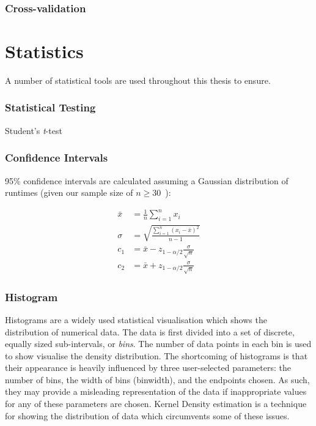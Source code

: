 \subsubsection{Cross-validation}


\section{Statistics}

A number of statistical tools are used throughout this thesis to
ensure.

\subsubsection{Statistical Testing}

Student's \emph{t}-test


\subsubsection{Confidence Intervals}

95\% confidence intervals are calculated assuming a Gaussian
distribution of runtimes (given our sample size of
$n \ge 30$~\cite{Georges2007}):

\begin{align}
\bar{x} &= \frac{1}{n}\sum_{i=1}^{n} x_i\\
\sigma &= \sqrt{\frac{\sum_{i=1}^{n}(x_i - \bar{x})^2}{n - 1}}\\
c_1 &= \bar{x} - z_{1-\alpha/2}\frac{\sigma}{\sqrt{n}}\\
c_2 &= \bar{x} + z_{1-\alpha/2}\frac{\sigma}{\sqrt{n}}
\end{align}


\subsubsection{Histogram}

Histograms are a widely used statistical visualisation which shows the
distribution of numerical data. The data is first divided into a set
of discrete, equally sized sub-intervals, or \emph{bins}. The number
of data points in each bin is used to show visualise the density
distribution. The shortcoming of histograms is that their appearance
is heavily influenced by three user-selected parameters: the number of
bins, the width of bins (binwidth), and the endpoints chosen. As such,
they may provide a misleading representation of the data if
inappropriate values for any of these parameters are chosen. Kernel
Density estimation is a technique for showing the distribution of data
which circumvents some of these issues.


